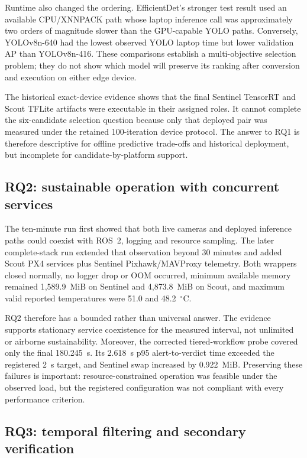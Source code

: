 Runtime also changed the ordering. EfficientDet's stronger test result used an
available CPU/XNNPACK path whose laptop inference call was approximately two
orders of magnitude slower than the GPU-capable YOLO paths. Conversely,
YOLOv8n-640 had the lowest observed YOLO laptop time but lower validation AP
than YOLOv8n-416. These comparisons establish a multi-objective selection
problem; they do not show which model will preserve its ranking after
conversion and execution on either edge device.

The historical exact-device evidence shows that the final Sentinel TensorRT
and Scout TFLite artifacts were executable in their assigned roles. It cannot
complete the six-candidate selection question because only that deployed pair
was measured under the retained 100-iteration device protocol. The answer to
RQ1 is therefore descriptive for offline predictive trade-offs and historical
deployment, but incomplete for candidate-by-platform support.

\subsection*{RQ2: sustainable operation with concurrent services}

The ten-minute run first showed that both live cameras and deployed inference
paths could coexist with ROS~2, logging and resource sampling. The later
complete-stack run extended that observation beyond 30 minutes and added Scout
PX4 services plus Sentinel Pixhawk/MAVProxy telemetry. Both wrappers closed
normally, no logger drop or OOM occurred, minimum available memory remained
1,589.9~MiB on Sentinel and 4,873.8~MiB on Scout, and maximum valid reported
temperatures were 51.0 and 48.2~\(^{\circ}\)C.

RQ2 therefore has a bounded rather than universal answer. The evidence supports
stationary service coexistence for the measured interval, not unlimited or
airborne sustainability. Moreover, the corrected tiered-workflow probe covered only
the final 180.245~s. Its 2.618~s p95 alert-to-verdict time exceeded the
registered 2~s target, and Sentinel swap increased by 0.922~MiB. Preserving
these failures is important: resource-constrained operation was feasible under
the observed load, but the registered configuration was not compliant with
every performance criterion.

\subsection*{RQ3: temporal filtering and secondary verification}


